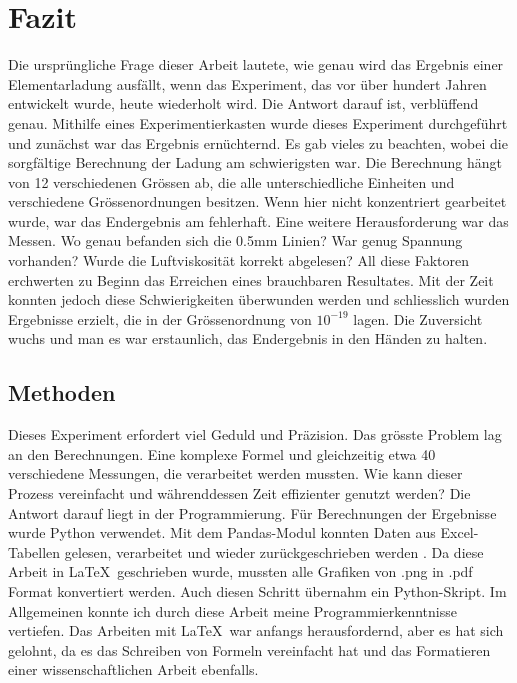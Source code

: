 \chapter{Fazit}\label{cha:fazit}
Die ursprüngliche Frage dieser Arbeit lautete, wie genau wird das Ergebnis einer Elementarladung ausfällt, wenn das Experiment, das vor über hundert Jahren entwickelt wurde, heute wiederholt wird. Die Antwort darauf ist, verblüffend genau. Mithilfe eines Experimentierkasten wurde dieses Experiment durchgeführt und zunächst war das Ergebnis ernüchternd. Es gab vieles zu beachten, wobei die sorgfältige Berechnung der Ladung am schwierigsten war. Die Berechnung hängt von 12 verschiedenen Grössen ab, die alle unterschiedliche Einheiten und verschiedene Grössenordnungen besitzen. Wenn hier nicht konzentriert gearbeitet wurde, war das Endergebnis am fehlerhaft. Eine weitere Herausforderung war das Messen. Wo genau befanden sich die 0.5mm Linien? War genug Spannung vorhanden? Wurde die Luftviskosität korrekt abgelesen? All diese Faktoren erchwerten zu Beginn das Erreichen eines brauchbaren Resultates. Mit der Zeit konnten jedoch diese Schwierigkeiten überwunden werden und schliesslich wurden Ergebnisse erzielt, die in der Grössenordnung von $10^{-19}$ lagen. Die Zuversicht wuchs und man es war erstaunlich, das Endergebnis in den Händen zu halten. 

\section{Methoden}\label{sec:methoden}
Dieses Experiment erfordert viel Geduld und Präzision. Das grösste Problem lag an den Berechnungen. Eine komplexe Formel und gleichzeitig etwa 40 verschiedene Messungen, die verarbeitet werden mussten. Wie kann dieser Prozess vereinfacht und währenddessen Zeit effizienter genutzt werden? Die Antwort darauf liegt in der Programmierung. Für Berechnungen der Ergebnisse wurde Python verwendet. Mit dem Pandas-Modul konnten Daten aus Excel-Tabellen gelesen, verarbeitet und wieder zurückgeschrieben werden \parencite[vgl.]{Inc_2024}. 
Da diese Arbeit in \LaTeX~geschrieben wurde, mussten alle Grafiken von .png in .pdf Format konvertiert werden. Auch diesen Schritt übernahm ein Python-Skript. 
Im Allgemeinen konnte ich durch diese Arbeit meine Programmierkenntnisse vertiefen. Das Arbeiten mit \LaTeX~war anfangs herausfordernd, aber es hat sich gelohnt, da es das Schreiben von Formeln vereinfacht hat und das Formatieren einer wissenschaftlichen Arbeit ebenfalls. 

